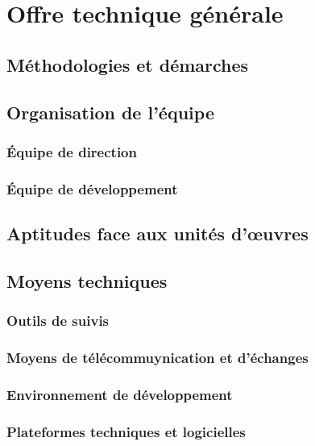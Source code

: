 	\chapter{Offre technique générale}
	

	\section{Méthodologies et démarches}
	\section{Organisation de l'équipe}
	\subsection{Équipe de direction}
	\subsection{Équipe de développement}
	\section{Aptitudes face aux unités d'œuvres}
	\section{Moyens techniques}
	\subsection{Outils de suivis}
	\subsection{Moyens de télécommuynication et d'échanges}
	\subsection{Environnement de développement}
	\subsection{Plateformes techniques et logicielles}